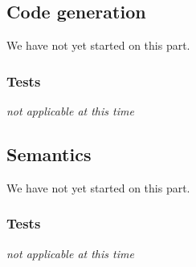 \documentclass[11pt]{article}
\begin{document}
\subsection{Code generation}
We have not yet started on this part.

\subsubsection{Tests}%
{\it not applicable at this time}%

\subsection{Semantics}
We have not yet started on this part.

\subsubsection{Tests}
{\it not applicable at this time}%
\end{document}
